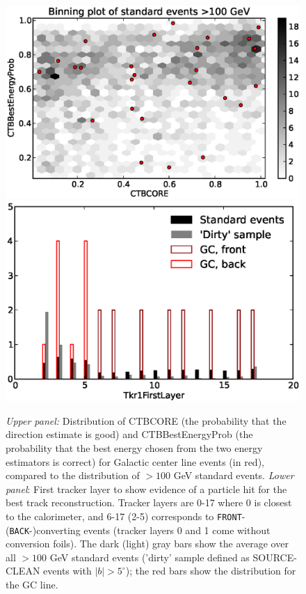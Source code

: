 \documentclass[aps,twocolumn,prd,superscriptaddress,showpacs,nofootinbib,fixfloat]{revtex4}
\begin{document}
\begin{figure}
  \centering
  \includegraphics[width=1.00\linewidth]{plots/CTBCORE_CTBBestEnergyProb.eps}
  \includegraphics[width=1.00\linewidth]{plots/Tkr1FirstLayer.eps}
  \caption{\emph{Upper panel:} Distribution of CTBCORE (the
  probability that the direction estimate is good) and
  CTBBestEnergyProb (the probability that the best energy
  chosen from the two energy estimators is correct) for
  Galactic center line events (in red), compared to the
  distribution of $>100$ GeV standard events. \emph{Lower
  panel}: First tracker layer to show evidence of a particle
  hit for the best track reconstruction. Tracker layers are
  0-17 where 0 is closest to the calorimeter, and 6-17 (2-5)
  corresponds to \texttt{FRONT}- (\texttt{BACK}-)converting events (tracker
  layers 0 and 1 come without conversion foils). The dark (light) gray
  bars show the average over all $>100$ GeV
  standard events ('dirty' sample defined as SOURCE-CLEAN events with
  $|b|>5^\circ$); the red bars show the distribution for the GC line.}
  \label{fig:CTBquality}
\end{figure}
\end{document}
